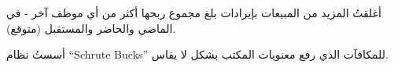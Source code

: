 \begin{achievements}
	\item أغلقتُ المزيد من المبيعات بإيرادات بلغ مجموع ربحها أكثر من أي موظف آخر - في الماضي والحاضر والمستقبل (متوقع).
	\item أسستُ نظام \foreignlanguage{english}{``Schrute Bucks''} للمكافآت الذي رفع معنويات المكتب بشكل لا يقاس.
\end{achievements}
